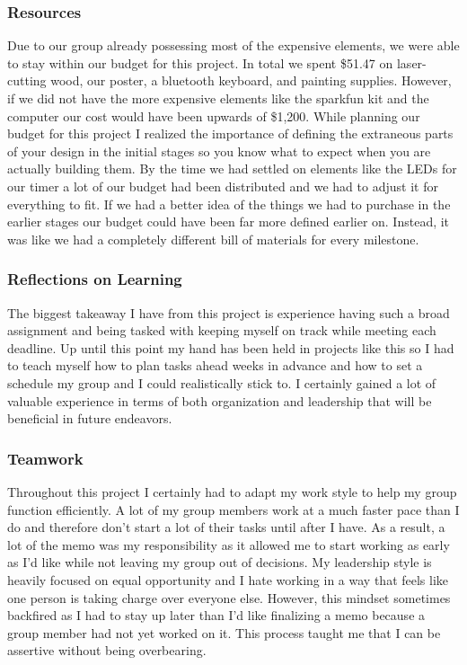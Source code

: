 \documentclass[conference]{IEEEtran}
\begin{document}
\subsubsection{Resources}

\par Due to our group already possessing most of the expensive elements, we were able to stay within our budget for this project. In total we spent \$51.47 on laser-cutting wood, our poster, a bluetooth keyboard, and painting supplies. However, if we did not have the more expensive elements like the sparkfun kit and the computer our cost would have been upwards of \$1,200. While planning our budget for this project I realized the importance of defining the extraneous parts of your design in the initial stages so you know what to expect when you are actually building them. By the time we had settled on elements like the LEDs for our timer a lot of our budget had been distributed and we had to adjust it for everything to fit. If we had a better idea of the things we had to purchase in the earlier stages our budget could have been far more defined earlier on. Instead, it was like we had a completely different bill of materials for every milestone. 

\subsubsection{Reflections on Learning}

\par The biggest takeaway I have from this project is experience having such a broad assignment and being tasked with keeping myself on track while meeting each deadline. Up until this point my hand has been held in projects like this so I had to teach myself how to plan tasks ahead weeks in advance and how to set a schedule my group and I could realistically stick to. I certainly gained a lot of valuable experience in terms of both organization and leadership that will be beneficial in future endeavors. 

\subsubsection{Teamwork}

\par Throughout this project I certainly had to adapt my work style to help my group function efficiently. A lot of my group members work at a much faster pace than I do and therefore don’t start a lot of their tasks until after I have. As a result, a lot of the memo was my responsibility as it allowed me to start working as early as I’d like while not leaving my group out of decisions. My leadership style is heavily focused on equal opportunity and I hate working in a way that feels like one person is taking charge over everyone else. However, this mindset sometimes backfired as I had to stay up later than I’d like finalizing a memo because a group member had not yet worked on it. This process taught me that I can be assertive without being overbearing.
\end{document}

